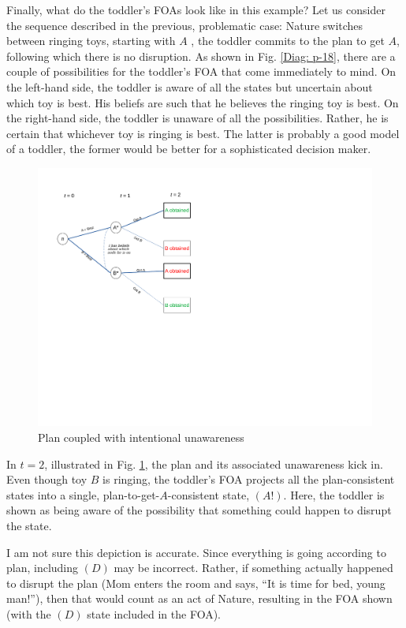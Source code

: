 \documentclass[
11pt,
titlepage,
reqno,
]{article}%
\theoremstyle{definition}
\begin{document}
Finally, what do the toddler's FOAs look like in this example? Let us consider the sequence described in the previous, problematic case: Nature switches between ringing toys, starting with $A$ , the toddler commits to the plan to get $A$, following which there is no disruption. As shown in Fig. \ref{Diag: p-18}, there are a couple of possibilities for the toddler's FOA that come immediately to mind. On the left-hand side, the toddler is aware of all the states but uncertain about which toy is best. His beliefs are such that he believes the ringing toy is best. On the right-hand side, the toddler is unaware of all the possibilities. Rather, he is certain that whichever toy is ringing is best. The latter is probably a good model of a toddler, the former would be better for a sophisticated decision maker.

\begin{figure}[h!]
	\centering
	\includegraphics*[page=19,trim = 0in 4in 1in 0in,scale=.65]{Awareness_Diagrams_All}
	\caption{Plan coupled with intentional unawareness\label{Diag: p-19}}%
\end{figure}

In $t=2$, illustrated in Fig. \ref{Diag: p-19}, the plan and its associated unawareness kick in. Even though toy $B$ is ringing, the toddler's FOA projects all the plan-consistent states into a single, plan-to-get-$A$-consistent state, $(A!)$. Here, the toddler is shown as being aware of the possibility that something could happen to disrupt the state. 

I am not sure this depiction is accurate. Since everything is going according to plan, including $(D)$ may be incorrect. Rather, if something actually happened to disrupt the plan (Mom enters the room and says, ``It is time for bed, young man!''), then that would count as an act of Nature, resulting in the FOA shown (with the $(D)$ state included in the FOA). 
\end{document}
